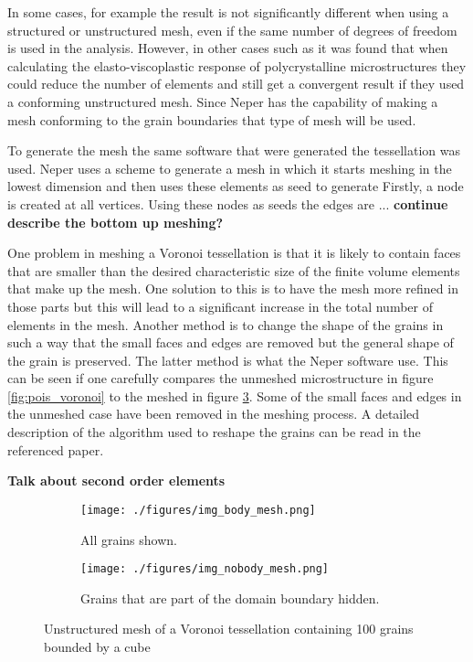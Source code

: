 \documentclass[meshing_micro.tex]{subfiles}
\begin{document}
In some cases, for example \cite{Bohlke201011} the result is not significantly different when using a structured or unstructured mesh, even if the same number of degrees of freedom is used in the analysis. However, in other cases such as \cite{Li20091163} it was found that when calculating the elasto-viscoplastic response of polycrystalline microstructures they could reduce the number of elements and still get a convergent result if they used a conforming unstructured mesh. Since Neper has the capability of making a mesh conforming to the grain boundaries that type of mesh will be used. 


To generate the mesh the same software that were generated the tessellation was used. Neper uses a scheme to generate a mesh in which it starts meshing in the lowest dimension and then uses these elements as seed to generate  Firstly, a node is created at all vertices. Using these nodes as seeds the edges are ... \textbf{continue describe the bottom up meshing?}


One problem in meshing a Voronoi tessellation is that it is likely to contain faces that are smaller than the desired characteristic size of the finite volume elements that make up the mesh. One solution to this is to have the mesh more refined in those    parts but this will lead to a significant increase in the total number of elements in the mesh. Another method is to change the shape of the grains in such a way that the small faces and edges are removed but the general shape of the grain is preserved. The latter method is what the Neper software use. This can be seen if one carefully compares the unmeshed microstructure in figure \ref{fig:pois_voronoi} to the meshed in figure \ref{fig:pois_voronoi_mesh}. Some of the small faces and edges in the unmeshed case have been removed in the meshing process. A detailed description of the algorithm used to reshape the grains can be read in the referenced paper.

\textbf{Talk about second order elements}

 
 \begin{figure}
\centering
\begin{subfigure}[b]{.5\textwidth}
  \centering
  \texttt{[image: ./figures/img\_body\_mesh.png]}
  \caption{All grains shown.}
  \label{fig:pois_voronoi_a_mesh}
\end{subfigure}%
\begin{subfigure}[b]{.5\textwidth}
  \centering
  \texttt{[image: ./figures/img\_nobody\_mesh.png]}
  \caption{Grains that are part of the domain boundary hidden.}
  \label{fig:pois_voronoi_b_mesh}
\end{subfigure}
\caption{Unstructured mesh of a Voronoi tessellation containing 100 grains bounded by a cube}
\label{fig:pois_voronoi_mesh}
\end{figure}
\end{document}
